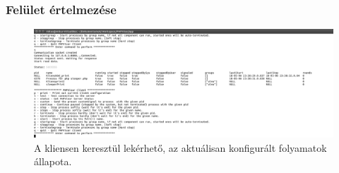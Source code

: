 \documentclass[12pt]{report}
\begin{document}
  \pagebreak

\subsubsection{Felület értelmezése}\label{par:mean}
 \begin{figure}[ht]
  \centering
  \includegraphics[width=15cm]{pics/stat.png}
	  \caption{A kliensen keresztül lekérhető, az aktuálisan konfigurált folyamatok állapota.}
      \label{fig:clistat}
  \end{figure}
  
\end{document}

